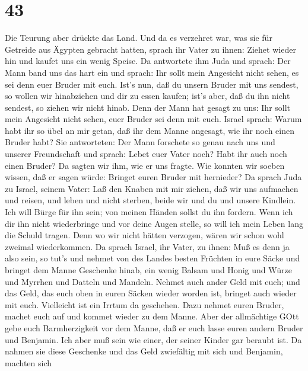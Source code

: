 \hypertarget{section-42}{%
\section{43}\label{section-42}}

 Die Teurung aber drückte das Land.  Und da es
verzehret war, was sie für Getreide aus Ägypten gebracht hatten, sprach
ihr Vater zu ihnen: Ziehet wieder hin und kaufet uns ein wenig Speise.
 Da antwortete ihm Juda und sprach: Der Mann band uns das
hart ein und sprach: Ihr sollt mein Angesicht nicht sehen, es sei denn
euer Bruder mit euch.  Ist's nun, daß du unsern Bruder mit
uns sendest, so wollen wir hinabziehen und dir zu essen kaufen;
 ist's aber, daß du ihn nicht sendest, so ziehen wir nicht
hinab. Denn der Mann hat gesagt zu uns: Ihr sollt mein Angesicht nicht
sehen, euer Bruder sei denn mit euch.  Israel sprach: Warum
habt ihr so übel an mir getan, daß ihr dem Manne angesagt, wie ihr noch
einen Bruder habt?  Sie antworteten: Der Mann forschete so
genau nach uns und unserer Freundschaft und sprach: Lebet euer Vater
noch? Habt ihr auch noch einen Bruder? Da sagten wir ihm, wie er uns
fragte. Wie konnten wir soeben wissen, daß er sagen würde: Bringet euren
Bruder mit hernieder?  Da sprach Juda zu Israel, seinem
Vater: Laß den Knaben mit mir ziehen, daß wir uns aufmachen und reisen,
und leben und nicht sterben, beide wir und du und unsere Kindlein.
 Ich will Bürge für ihn sein; von meinen Händen sollst du
ihn fordern. Wenn ich dir ihn nicht wiederbringe und vor deine Augen
stelle, so will ich mein Leben lang die Schuld tragen. 
Denn wo wir nicht hätten verzogen, wären wir schon wohl zweimal
wiederkommen.  Da sprach Israel, ihr Vater, zu ihnen: Muß
es denn ja also sein, so tut's und nehmet von des Landes besten Früchten
in eure Säcke und bringet dem Manne Geschenke hinab, ein wenig Balsam
und Honig und Würze und Myrrhen und Datteln und Mandeln. 
Nehmet auch ander Geld mit euch; und das Geld, das euch oben in euren
Säcken wieder worden ist, bringet auch wieder mit euch. Vielleicht ist
ein Irrtum da geschehen.  Dazu nehmet euren Bruder, machet
euch auf und kommet wieder zu dem Manne.  Aber der
allmächtige GOtt gebe euch Barmherzigkeit vor dem Manne, daß er euch
lasse euren andern Bruder und Benjamin. Ich aber muß sein wie einer, der
seiner Kinder gar beraubt ist.  Da nahmen sie diese
Geschenke und das Geld zwiefältig mit sich und Benjamin, machten sich
